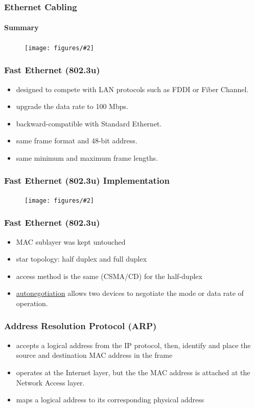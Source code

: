 \documentclass{beamer}
\newcommand{\fig}[2]{
\begin{center}
\begin{figure}
\texttt{[image: figures/\#2]}
\end{figure}
\end{center}
}
\begin{document}
\begin{frame}
\frametitle{\huge Ethernet Cabling} 
\framesubtitle{Summary}
\fig{0.4}{network_cabling}
\end{frame}



\begin{frame}
\frametitle{\huge Fast Ethernet (802.3u)} 
\Large
 \begin{itemize} 
\item <1-> designed to compete with LAN protocols such as FDDI or Fiber Channel. 
\item <2-> upgrade the data rate to 100 Mbps.
\item <3-> backward-compatible with Standard Ethernet.
\item <4-> same frame format and 48-bit address.
\item <5-> same minimum and maximum frame lengths.
\end{itemize}
\end{frame}


\begin{frame}
\frametitle{\huge Fast Ethernet (802.3u) Implementation} 
\fig{0.5}{network_fastethernet}
\end{frame}


\begin{frame}
\frametitle{\huge Fast Ethernet (802.3u)} 
\Large
 \begin{itemize} 
\item <1-> MAC sublayer was kept untouched
\item <2-> star topology: half duplex and full duplex
\item <3-> access method is the same (CSMA/CD) for the half-duplex
\item <4-> \underline{autonegotiation} allows two devices to negotiate the mode or data rate of operation.
\end{itemize}
\end{frame}


\begin{frame}
\frametitle{\huge Address Resolution Protocol (ARP)} 
\Large
 \begin{itemize} 
\item <1-> accepts a logical address from the IP protocol, then, identify and place the source and destination MAC address in the frame
\item <2-> operates at the Internet layer, but the the MAC address is attached at the Network Access layer.
\item <3-> maps a logical address to its corresponding physical address
\end{itemize}
\end{frame}
\end{document}
